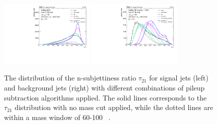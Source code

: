 \begin{figure}[h!] 
    \centering 
    \includegraphics[width=0.40\textwidth]{figures/event_reconstruction/sig_tau21.pdf}
    \includegraphics[width=0.40\textwidth]{figures/event_reconstruction/bkg_tau21.pdf}
     \caption{The distribution of the n-subjettiness ratio $\tau_{21}$ for signal jets (left) and background jets (right) with different combinations of pileup subtraction algorithms applied. The solid lines corresponds to the $\tau_{21}$ distribution with no mass cut applied, while the dotted lines are within a mass window of 60-100 \GeV~\cite{CMS-PAS-JME-14-001}.}
     \label{fig:objreco:tau21}
 \end{figure}

